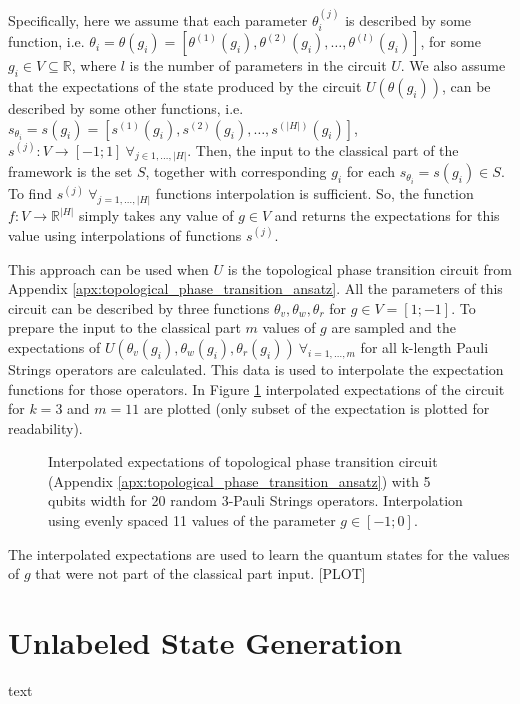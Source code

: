 Specifically, here we assume that each parameter $\theta_i^{(j)}$ is described by some
function, i.e. $\theta_i = \theta(g_i) = [\theta^{(1)}(g_i), \theta^{(2)}(g_i), \ldots,
\theta^{(l)}(g_i)]$, for some $g_i \in V \subseteq 
\mathbb{R}$, where $l$ is the number of parameters in the circuit $U$.
We also assume that the expectations of the state produced by the
circuit $U(\theta(g_i))$, can be described by some other functions,
i.e. $s_{\theta_i} = s(g_i) = [s^{(1)}(g_i), s^{(2)}(g_i), \ldots,
s^{(|H|)}(g_i)]$, $s^{(j)}: V \to [-1; 1]\ \forall_{j \in 1,\ldots,|H|}$.
Then, the input to the classical part of the framework is the set $S$, together with
corresponding $g_i$ for each $s_{\theta_i} = s(g_i) \in S$.
To find $s^{(j)}\ \forall_{j=1,\ldots,|H|}$ functions interpolation is
sufficient. So, the function $f: V \to \mathbb{R}^{|H|}$ simply takes
any value of $g \in V$ and returns the expectations for this value using
interpolations of functions $s^{(j)}$.

This approach can be used when $U$ is the topological phase transition circuit from
Appendix \ref{apx:topological_phase_transition_ansatz}. All the parameters of
this circuit can be described by three functions $\theta_v, \theta_w, \theta_r$
for $g \in V = [1; -1]$. To prepare the input to the classical part 
 $m$ values of $g$ are sampled and the expectations of $U(\theta_v(g_i),
\theta_w(g_i), \theta_r(g_i))\ \forall_{i=1,\ldots,m}$ for all k-length Pauli
Strings operators are calculated. This data is used to interpolate the expectation functions for those
operators.  
In Figure \ref{fig:phase_exps} interpolated expectations of the circuit for
$k=3$ and $m=11$ are plotted (only subset of the expectation is plotted for readability).

\begin{figure}[htbp!]
  \captionsetup[subfigure]{labelformat=empty}
  \centering
  \label{fig:phase_exps}
  \caption{Interpolated expectations of topological phase transition circuit (Appendix
    \ref{apx:topological_phase_transition_ansatz}) with 5 qubits width for 20
    random 3-Pauli Strings operators. Interpolation using evenly
    spaced 11 values of the parameter $g \in [-1; 0]$. 
  }
\end{figure}

The interpolated expectations are used to learn the quantum states for
the values of $g$ that were not part of the classical part input. [PLOT]

\section{Unlabeled State Generation}
text

